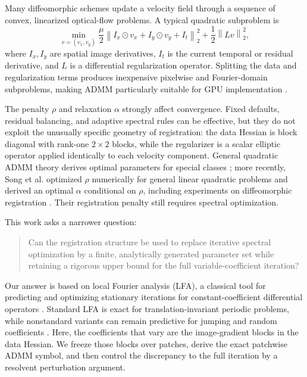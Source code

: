 \documentclass[11pt]{article}
\theoremstyle{definition}
\newcommand{\norm}[1]{\left\lVert #1\right\rVert}
\begin{document}
Many diffeomorphic schemes update a velocity field through a sequence of convex, linearized optical-flow problems. A typical quadratic subproblem is
\begin{equation}
\min_{v=(v_x,v_y)}
\frac{\mu}{2}\norm{I_x\odot v_x+I_y\odot v_y+I_t}_2^2
+\frac{1}{2}\norm{Lv}_2^2,
\label{eq:registration}
\end{equation}
where $I_x,I_y$ are spatial image derivatives, $I_t$ is the current temporal or residual derivative, and $L$ is a differential regularization operator. Splitting the data and regularization terms produces inexpensive pixelwise and Fourier-domain subproblems, making ADMM particularly suitable for GPU implementation \cite{Thorley2021,Song2024}.

The penalty $\rho$ and relaxation $\alpha$ strongly affect convergence. Fixed defaults, residual balancing, and adaptive spectral rules can be effective, but they do not exploit the unusually specific geometry of registration: the data Hessian is block diagonal with rank-one $2\times2$ blocks, while the regularizer is a scalar elliptic operator applied identically to each velocity component. General quadratic ADMM theory derives optimal parameters for special classes \cite{Ghadimi2015,Teixeira2016,GiselssonBoyd2017}; more recently, Song et al. optimized $\rho$ numerically for general linear quadratic problems and derived an optimal $\alpha$ conditional on $\rho$, including experiments on diffeomorphic registration \cite{Song2024}. Their registration penalty still requires spectral optimization.

This work asks a narrower question:
\begin{quote}
Can the registration structure be used to replace iterative spectral optimization by a finite, analytically generated parameter set while retaining a rigorous upper bound for the full variable-coefficient iteration?
\end{quote}

Our answer is based on local Fourier analysis (LFA), a classical tool for predicting and optimizing stationary iterations for constant-coefficient differential operators \cite{ChanElman1989,WienandsJoppich2005}. Standard LFA is exact for translation-invariant periodic problems, while nonstandard variants can remain predictive for jumping and random coefficients \cite{Kumar2019,Rodrigo2017}. Here, the coefficients that vary are the image-gradient blocks in the data Hessian. We freeze those blocks over patches, derive the exact patchwise ADMM symbol, and then control the discrepancy to the full iteration by a resolvent perturbation argument.
\end{document}
